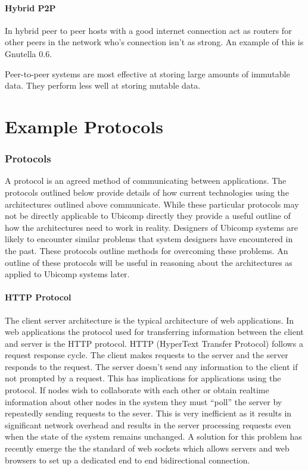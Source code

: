 \documentclass[11pt]{amsart}
\begin{document}
\subsection{Hybrid P2P}
In hybrid peer to peer hosts with a good internet connection act as routers for other peers in the network who's connection isn't as strong. An example of this is Gnutella 0.6.


Peer-to-peer systems are most effective at storing large amounts of immutable data. They perform less well at storing mutable data.


\part{Example Protocols}

\section{Protocols}

A protocol is an agreed method of communicating between applications. The protocols outlined below provide details of how current technologies using the architectures outlined above communicate. While these particular protocols may not be directly applicable to Ubicomp directly they provide a useful outline of how the architectures need to work in reality. Designers of Ubicomp systems are likely to encounter similar problems that system designers have encountered in the past. These protocols outline methods for overcoming these problems. An outline of these protocols will be useful in reasoning about the architectures as applied to Ubicomp systems later.

\subsection{HTTP Protocol}

The client server architecture is the typical architecture of web applications. In web applications the protocol used for transferring information between the client and server is the HTTP protocol. HTTP (HyperText Transfer Protocol) follows a request response cycle. The client makes requests to the server and the server responds to the request. The server doesn't send any information to the client if not prompted by a request. This has implications for applications using the protocol. If nodes wish to collaborate with each other or obtain realtime information about other nodes in the system they must ``poll'' the server by repeatedly sending requests to the sever. This is very inefficient as it results in significant network overhead and results in the server processing requests even when the state of the system remains unchanged. A solution for this problem has recently emerge the the standard of web sockets which allows servers and web browsers to set up a dedicated end to end bidirectional connection.
\end{document}
